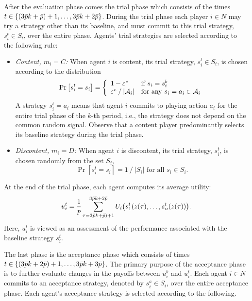 \vspace{.1cm}
%
 After the evaluation phase comes the trial phase which consists of the times $t \in \{(3\bar{p} k + \bar{p})+1,\ldots ,3\bar{p} k +2 \bar{p}\}$.  During the trial phase each player $i\in N$ may try a strategy other than its baseline, and must commit to this trial strategy, $s_i^t \in S_i$, over the entire phase.  Agents' trial strategies are selected according to the following rule:
%


\begin{itemize}%
%
\item {\it Content, $m_i = C$:}
When agent $i$ is content, its trial strategy, $s_i^t \in S_i$, is chosen according to the  distribution
\begin{equation}
\operatorname{ Pr }\left[s_i^t = s_i \right] = \left\{
\begin{array}{ll}
1 - \varepsilon^c &\text{if }s_i = s_i^b \\
\varepsilon^c \mathbin{/} |\mathcal{A}_i|&\text{for any } s_i = a_i\in\mathcal{A}_i
\end{array}\right.
\end{equation}
%
A strategy $s_i^t = a_i$ means that agent $i$ commits to playing action $a_i$ for the entire trial phase of the $k$-th period, i.e., the strategy does not depend on the common random signal.  Observe that a content player predominantly selects its baseline strategy during the trial phase.

\item {\it Discontent, $m_i = D$:}
When agent $i$ is discontent, its trial strategy, $s_i^t$, is chosen randomly from the set $S_i$,
\begin{equation}\label{eq:981}
\Pr\left[s_i^t = s_i\right] = 1\mathbin{/} |S_i| \text{ for all } s_i\in S_i.
\end{equation}
%

%
\end{itemize}

At the end of the trial phase, each agent computes its average utility:
%
\begin{equation}\label{e:trial payoff}
u_i^t = {1\over \bar{p}}\sum_{\tau = 3\bar{p} k + \bar{p})+1}^{3\bar{p} k +2 \bar{p}}U_i\bigl(s_1^t(z(\tau), \dots, s_n^t(z(\tau))  \bigr).
\end{equation}
%
Here, $u_i^t$ is viewed as an assessment of the performance associated with the baseline strategy $s_i^t$.  
%

%
 The last phase is the acceptance phase which consists of times $t \in \{(3 \bar{p} k + 2\bar{p})+1, \dots, 3\bar{p} k + 3\bar{p}\}$.  The primary purpose of the acceptance phase is to further evaluate changes in the payoffs between $u_i^b$ and $u_i^t$.  Each agent $i \in N$ commits to an acceptance strategy, denoted by $s_i^a \in S_i$, over the entire acceptance phase.  Each agent's acceptance strategy is selected according to the following.
%

